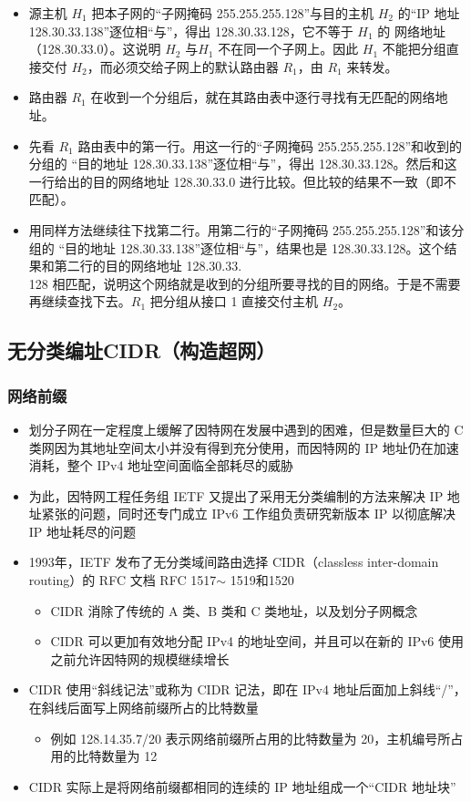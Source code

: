 \documentclass[cs4size,a4paper,10pt]{ctexart}
\begin{document}
	\begin{itemize}
		\item 源主机 $H_1$ 把本子网的“子网掩码 255.255.255.128”与目的主机 $H_2$ 的“IP 地址 128.30.33.138”逐位相“与”，得出 128.30.33.128，它不等于 $H_1$ 的 网络地址（128.30.33.0）。这说明 $H_2$ 与$H_1$ 不在同一个子网上。因此 $H_1$ 不能把分组直接交付 $H_2$，而必须交给子网上的默认路由器 $R_1$，由 $R_1$ 来转发。
		\item 路由器 $R_1$ 在收到一个分组后，就在其路由表中逐行寻找有无匹配的网络地址。
		\item 先看 $R_1$ 路由表中的第一行。用这一行的“子网掩码 255.255.255.128”和收到的分组的 “目的地址 128.30.33.138”逐位相“与”，得出 128.30.33.128。然后和这一行给出的目的网络地址 128.30.33.0 进行比较。但比较的结果不一致（即不匹配）。
		\item 用同样方法继续往下找第二行。用第二行的“子网掩码 255.255.255.128”和该分组的 “目的地址 128.30.33.138”逐位相“与”，结果也是 128.30.33.128。这个结果和第二行的目的网络地址 128.30.33.\\128 相匹配，说明这个网络就是收到的分组所要寻找的目的网络。于是不需要再继续查找下去。$R_1$ 把分组从接口 1 直接交付主机 $H_2$。
	\end{itemize}

	\subsection{无分类编址CIDR（构造超网）}

	\subsubsection{网络前缀}
	\begin{itemize}
		\item 划分子网在一定程度上缓解了因特网在发展中遇到的困难，但是数量巨大的 C 类网因为其地址空间太小并没有得到充分使用，而因特网的 IP 地址仍在加速消耗，整个 IPv4 地址空间面临全部耗尽的威胁
		\item 为此，因特网工程任务组 IETF 又提出了采用无分类编制的方法来解决 IP 地址紧张的问题，同时还专门成立 IPv6 工作组负责研究新版本 IP 以彻底解决 IP 地址耗尽的问题
		\item 1993年，IETF 发布了无分类域间路由选择 CIDR（classless inter-domain routing）的 RFC 文档 RFC 1517$\sim$ 1519和1520
		\begin{itemize}
			\item CIDR 消除了传统的 A 类、B 类和 C 类地址，以及划分子网概念
			\item CIDR 可以更加有效地分配 IPv4 的地址空间，并且可以在新的 IPv6 使用之前允许因特网的规模继续增长
		\end{itemize}
		\item CIDR 使用“斜线记法”或称为 CIDR 记法，即在 IPv4 地址后面加上斜线“/”，在斜线后面写上网络前缀所占的比特数量
		\begin{itemize}
			\item 例如 128.14.35.7/20 表示网络前缀所占用的比特数量为 20，主机编号所占用的比特数量为 12
		\end{itemize}
		\item CIDR 实际上是将网络前缀都相同的连续的 IP 地址组成一个“CIDR 地址块”
	\end{itemize}
\end{document}
